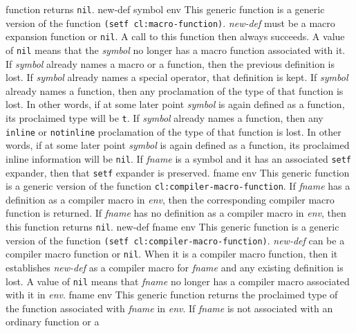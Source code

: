 function returns \texttt{nil}.
\vskip -0.05cm
\vskip -0.05cm
 {new-def symbol env}
\vskip -0.2cm
This generic function is a generic version of the \commonlisp{}
function \texttt{(setf cl:macro-function)}.
\vskip -0.05cm
\textit{new-def} must be a macro expansion function or \texttt{nil}.
A call to this function then always succeeds.  A value of \texttt{nil}
means that the \textit{symbol} no longer has a macro function
associated with it.  If \textit{symbol} already names a macro or a
function, then the previous definition is lost.  If \textit{symbol}
already names a special operator, that definition is kept.
\vskip -0.05cm
If \textit{symbol} already names a function, then any proclamation of
the type of that function is lost.  In other words, if at some later
point \textit{symbol} is again defined as a function, its proclaimed
type will be \texttt{t}.
\vskip -0.05cm
If \textit{symbol} already names a function, then any \texttt{inline} or
\texttt{notinline} proclamation of the type of that function is lost.  In other
words, if at some later point \textit{symbol} is again defined as a
function, its proclaimed inline information will be \texttt{nil}.
\vskip -0.05cm
If \textit{fname} is a symbol and it has an associated \texttt{setf}
expander, then that \texttt{setf} expander is preserved.
\vskip -0.05cm
 {fname env}
\vskip -0.2cm
This generic function is a generic version of the \commonlisp{}
function \texttt{cl:compiler-macro-function}.
\vskip -0.05cm
If \textit{fname} has a definition as a compiler macro in
\textit{env}, then the corresponding compiler macro function is
returned.
\vskip -0.05cm
If \textit{fname} has no definition as a compiler macro in
\textit{env}, then this function returns \texttt{nil}.
\vskip -0.05cm
 {new-def fname env}
\vskip -0.2cm
This generic function is a generic version of the \commonlisp{}
function \texttt{(setf cl:compiler-macro-function)}.
\vskip -0.05cm
\textit{new-def} can be a compiler macro function or \texttt{nil}.
When it is a compiler macro function, then it establishes
\textit{new-def} as a compiler macro for \textit{fname} and any
existing definition is lost.  A value of \texttt{nil} means that
\textit{fname} no longer has a compiler macro associated with it in
\textit{env}.
\vskip -0.05cm
 {fname env}
\vskip -0.2cm
This generic function returns the proclaimed type of the function
associated with \textit{fname} in \textit{env}.
\vskip -0.05cm
If \textit{fname} is not associated with an ordinary function or a
